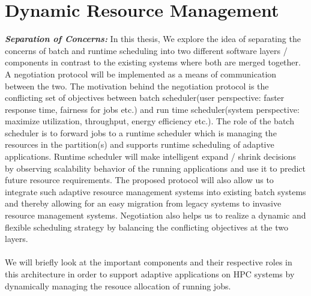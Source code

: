 \section{Dynamic Resource Management}
\textbf{\textit{Separation of Concerns: }}In this thesis, We explore the idea of separating the concerns of batch and runtime scheduling into
two different software layers / components in contrast to the existing systems where both are merged together. A negotiation protocol will be implemented as a means of communication between the two. The motivation behind the negotiation protocol is the conflicting set of objectives between batch scheduler(user perspective: faster response time, fairness for jobs etc.) and run time scheduler(system perspective: maximize utilization, throughput, energy efficiency etc.). The role of the batch scheduler is to forward jobs to a runtime scheduler which is managing the resources in the partition(s) and supports runtime scheduling of adaptive applications. Runtime scheduler will make intelligent expand / shrink decisions by observing scalability behavior of the running applications and use it to predict future resource requirements. The proposed protocol will also allow us to integrate such adaptive resource management systems into existing batch systems and thereby allowing for an easy migration from legacy systems to invasive resource management systems. Negotiation also helps us to realize a dynamic and flexible scheduling strategy by balancing the conflicting objectives at the two layers.\\ \\
We will briefly look at the important components and their respective roles in this architecture in order to support adaptive applications on HPC systems by dynamically managing the resouce allocation of running jobs. 
